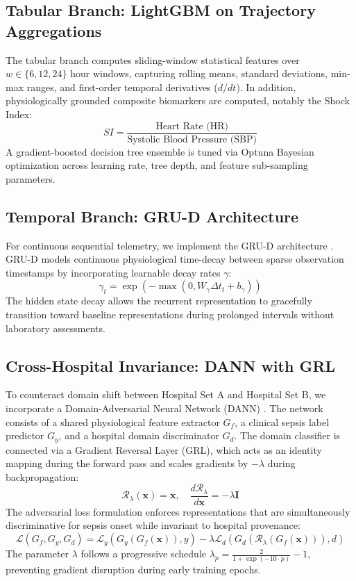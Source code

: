 \documentclass[conference]{IEEEtran}
\begin{document}
\subsection{Tabular Branch: LightGBM on Trajectory Aggregations}
The tabular branch computes sliding-window statistical features over $w \in \{6, 12, 24\}$ hour windows, capturing rolling means, standard deviations, min-max ranges, and first-order temporal derivatives ($d/dt$). In addition, physiologically grounded composite biomarkers are computed, notably the Shock Index:
\begin{equation}
    SI = \frac{\text{Heart Rate (HR)}}{\text{Systolic Blood Pressure (SBP)}}
\end{equation}
A gradient-boosted decision tree ensemble is tuned via Optuna Bayesian optimization across learning rate, tree depth, and feature sub-sampling parameters.

\subsection{Temporal Branch: GRU-D Architecture}
For continuous sequential telemetry, we implement the GRU-D architecture \cite{che2018recurrent}. GRU-D models continuous physiological time-decay between sparse observation timestamps by incorporating learnable decay rates $\gamma$:
\begin{equation}
    \gamma_t = \exp\left(-\max\left(0, W_\gamma \Delta t_t + b_\gamma\right)\right)
\end{equation}
The hidden state decay allows the recurrent representation to gracefully transition toward baseline representations during prolonged intervals without laboratory assessments.

\subsection{Cross-Hospital Invariance: DANN with GRL}
To counteract domain shift between Hospital Set A and Hospital Set B, we incorporate a Domain-Adversarial Neural Network (DANN) \cite{ganin2016domain}. The network consists of a shared physiological feature extractor $G_f$, a clinical sepsis label predictor $G_y$, and a hospital domain discriminator $G_d$. The domain classifier is connected via a Gradient Reversal Layer (GRL), which acts as an identity mapping during the forward pass and scales gradients by $-\lambda$ during backpropagation:
\begin{equation}
    \mathcal{R}_\lambda(\mathbf{x}) = \mathbf{x}, \quad \frac{d\mathcal{R}_\lambda}{d\mathbf{x}} = -\lambda \mathbf{I}
\end{equation}
The adversarial loss formulation enforces representations that are simultaneously discriminative for sepsis onset while invariant to hospital provenance:
\begin{equation}
    \mathcal{L}(G_f, G_y, G_d) = \mathcal{L}_y(G_y(G_f(\mathbf{x})), y) - \lambda \mathcal{L}_d(G_d(\mathcal{R}_\lambda(G_f(\mathbf{x}))), d)
\end{equation}
The parameter $\lambda$ follows a progressive schedule $\lambda_p = \frac{2}{1 + \exp(-10 \cdot p)} - 1$, preventing gradient disruption during early training epochs.
\end{document}
